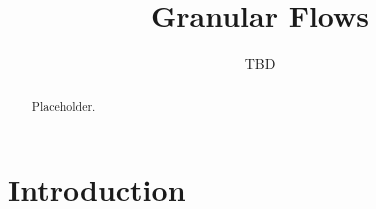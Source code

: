 \documentclass[11pt,dvips]{article}
\title{
%
Granular Flows
%
}
\author{
%
TBD
%
}
\numberwithin{equation}{section}
\begin{document}
\maketitle

\begin{abstract}
%
Placeholder.
%
\end{abstract}

\section{Introduction}
\label{s:intro}
\end{document}
